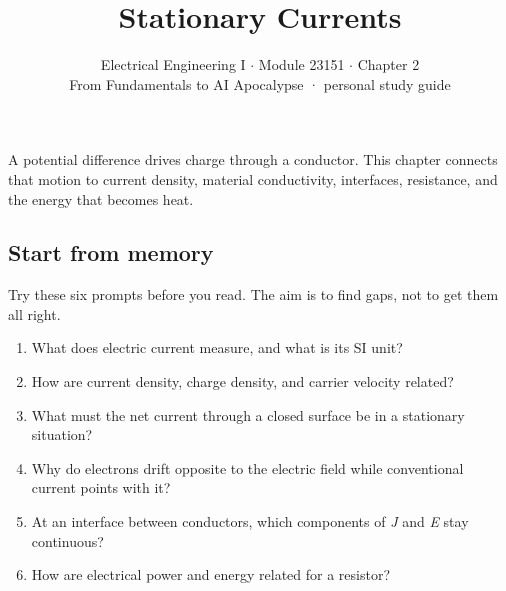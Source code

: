 \documentclass[11pt]{article}
\title{\sffamily\bfseries\color{FAUblue}Stationary Currents}
\author{Electrical Engineering I \ensuremath{\cdot} Module 23151 \ensuremath{\cdot} Chapter 2\\[2pt]\small From Fundamentals to AI Apocalypse · personal study guide}
\date{}
\begin{document}
\maketitle
\begingroup\footnotesize\setlength{\parskip}{0pt}\tableofcontents\endgroup
\clearpage

{\large A potential difference drives charge through a conductor. This chapter connects that motion to current density, material conductivity, interfaces, resistance, and the energy that becomes heat.}


\begin{keepsection}
\section{Start from memory}

Try these six prompts before you read. The aim is to find gaps, not to get them all right.

\begin{enumerate}
\item What does electric current measure, and what is its SI unit?
\item How are current density, charge density, and carrier velocity related?
\item What must the net current through a closed surface be in a stationary situation?
\item Why do electrons drift opposite to the electric field while conventional current points with it?
\item At an interface between conductors, which components of \textit{J} and \textit{E} stay continuous?
\item How are electrical power and energy related for a resistor?
\end{enumerate}

\end{keepsection}
\end{document}
